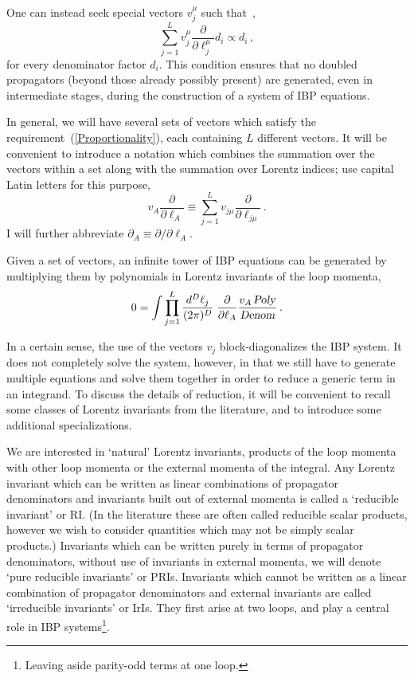 \documentclass[aps,prd,preprint,groupedaddress,nofootinbib,showpacs,eqsecnum]{revtex4}
\begin{document}
One can instead seek special vectors $v^\mu_j$ such 
that~\cite{IBPGeneratingVectors},
\begin{equation}
\sum_{j=1}^L v_j^\mu\frac{\partial}{\partial\ell_j^\mu} d_i \propto d_i\,,
\label{Proportionality}
\end{equation}
for every denominator factor $d_i$.
This condition ensures that
no doubled propagators (beyond those already possibly present) are
generated, even in intermediate stages, during the construction of a
system of IBP equations.

In general, we will have several sets of vectors which satisfy the
requirement~(\ref{Proportionality}), each containing $L$ different
vectors.  It will be convenient to introduce a notation which
combines the summation over the vectors within a set along with the
summation over Lorentz indices; use capital Latin letters for this purpose,
\begin{equation}
v_A\frac{\partial}{\partial\ell_A}
\equiv
\sum_{j=1}^L v_{j\mu}\frac{\partial}{\partial\ell_{j\mu}}\,.
\label{Shorthand}
\end{equation}
I will further abbreviate $\partial_A \equiv \partial/\partial\ell_A$.

Given a set of vectors, an infinite tower of IBP equations can be
generated by multiplying them by polynomials in Lorentz invariants
of the loop momenta,
\begin{equation}
0 = \int \prod_{j=1}^L \frac{d^D\ell_j}{(2\pi)^D}\; 
\frac{\partial}{\partial\ell_{A}}
\frac{v_{A}\,\textsl{Poly\/}}{\textsl{Denom\/}}\,.
\label{WithPolynomial}
\end{equation}

\def\LI{\textrm{LI}}
\def\RI{\textrm{RI}}
\def\II{\textrm{IrI}}
\def\PRI{\textrm{PRI}}
In a certain sense, the use of the vectors $v_j$ block-diagonalizes the IBP
system.  It does not completely solve the system, however, in that we still
have to generate multiple equations and solve them together in order to
reduce a generic term in an integrand.  To discuss the details of
reduction, it will be convenient to recall some classes of Lorentz
invariants from the literature, and to introduce some additional
specializations.

We are interested in `natural' Lorentz invariants,
products of the loop momenta with other loop momenta or the external
momenta of the integral.
Any Lorentz invariant which can be written as linear
combinations of propagator denominators and invariants built out of
external momenta is called a `reducible invariant' or \RI{}.  (In the literature
these are often called reducible scalar products, however we wish to
consider quantities which may not be simply scalar products.)  
Invariants
which can be written purely in terms of propagator denominators,
without use of invariants in external momenta, we will denote `pure
reducible invariants' or \PRI{}s.  
Invariants which cannot be written as a
linear combination of propagator denominators and external invariants are
called `irreducible invariants' or \II{}s.  They first arise at two loops,
and play a central role in IBP systems\footnote{Leaving aside parity-odd
  terms at one loop.}.  
\end{document}
